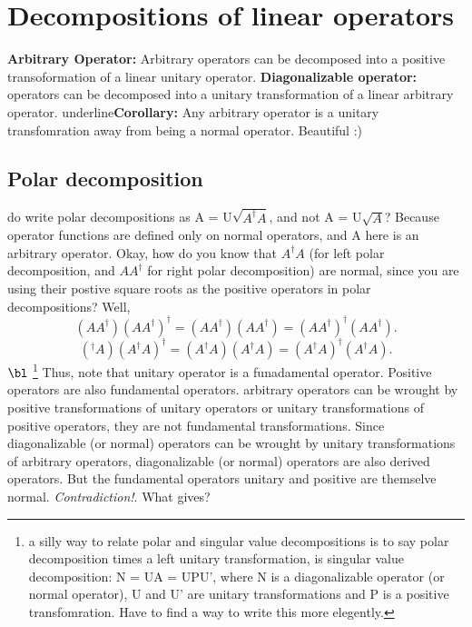 \documentclass[a4paper,12pt]{amsbook}
\newcommand{\0}{{$|0\rangle$}}
\newcommand{\1}{{$|1\rangle$}}
\begin{document}
\begin{enumerate}
\begin{enumerate}
\end{enumerate}
\chapter{Decompositions of linear operators}
\textbf{Arbitrary Operator: }
Arbitrary operators can be decomposed into a positive transoformation of a linear unitary operator.
    \textbf{Diagonalizable operator: }
    operators can be decomposed into a unitary transformation of a linear arbitrary operator.
    underline{\textbf{Corollary: }} Any arbitrary operator is a unitary transfomration away from being a normal operator. Beautiful :)
    \section{Polar decomposition}
    do write polar decompositions as A = U$\sqrt{A^\dag A}$, and not A = U$\sqrt A$? Because operator functions are defined only on normal operators, and A here is an arbitrary operator. 
    Okay, how do you know that $A^\dag A$ (for left polar decomposition, and $AA^\dag$ for right polar decomposition) are normal, since you are using their postive square roots as the positive operators in polar decompositions? Well, $$ (AA^\dag) (AA^\dag)^\dag = (AA^\dag) (AA^\dag) = (AA^\dag)^\dag (AA^\dag). $$
$$ (^\dag A) (A^\dag A)^\dag = (A^\dag A) (A^\dag A) = (A^\dag A)^\dag (A^\dag A). $$
$\bl$
    \footnote{a silly way to relate polar and singular value decompositions is to say polar decomposition times a left unitary transformation, is singular value decomposition: N = UA = UPU', where N is a diagonalizable operator (or normal operator), U and U' are unitary transformations and P is a positive transfomration. Have to find a way to write this more elegently.}
    Thus, note that unitary operator is a funadamental operator. Positive operators are also fundamental operators. 
    arbitrary operators can be wrought by positive transformations of unitary operators or unitary transformations of positive operators, they are not fundamental transformations.
    Since diagonalizable (or normal) operators can be wrought by unitary transformations of arbitrary operators, diagonalizable (or normal) operators are also derived operators.
    But the fundamental operators unitary and positive are themselve normal. \textit{Contradiction!}. What gives?


\end{enumerate}
\end{document}
